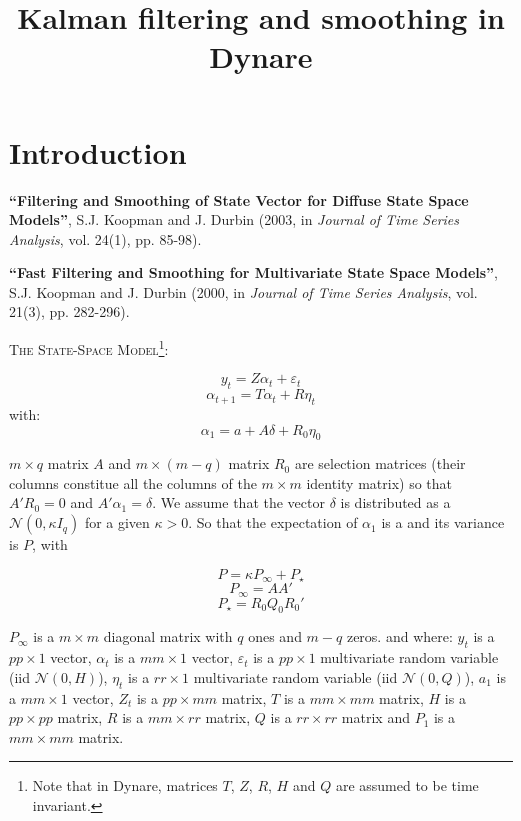 \documentclass{amsart}
\theoremstyle{definition}
\theoremstyle{remark}
\numberwithin{equation}{section}
\begin{document}
\title{Kalman filtering and smoothing in Dynare}%
\maketitle

\section*{Introduction}

\noindent \textbf{``Filtering and Smoothing of State Vector for
Diffuse State Space Models''}, S.J. Koopman and J. Durbin (2003,
in \textit{Journal of Time Series Analysis}, vol. 24(1), pp.
85-98).\newline

\noindent \textbf{``Fast Filtering and Smoothing for Multivariate
State Space Models''}, S.J. Koopman and J. Durbin (2000, in
\textit{Journal of Time Series Analysis}, vol. 21(3), pp.
282-296).\newline


\bigskip

\noindent \textsc{The State-Space Model}\footnote{Note that in
Dynare, matrices $T$, $Z$, $R$, $H$ and $Q$ are assumed to be time
invariant.}:

\[y_t =   Z\alpha_t + \varepsilon_t\]
\[\alpha_{t+1} = T \alpha_t + R\eta_t\]
with:
\[\alpha_1 = a + A\delta + R_0\eta_0\]

\noindent $m\times q$ matrix $A$ and $m\times(m-q)$ matrix $R_0$
are selection matrices (their columns constitue all the columns of
the $m\times m$ identity matrix) so that $A'R_0 = 0$ and
$A'\alpha_1 = \delta$. We assume that the vector $\delta$ is
distributed as a $\mathcal{N}(0,\kappa I_q)$ for a given  $\kappa
> 0$. So that the expectation of $\alpha_1$ is a and its variance
is $P$, with

\[ P = \kappa P_{\infty} + P_{\star}\]
\[           P_{\infty} = A A'\]
\[ P_{\star}  = R_0 Q_0 R_0'\]

\noindent $P_{\infty}$ is a $m\times m$ diagonal matrix with $q$
ones and $m-q$ zeros. and where: $y_t$ is a $pp\times 1$ vector,
$\alpha_t$ is a $mm\times 1$ vector, $\varepsilon_t$ is a
$pp\times 1$ multivariate random variable (iid
$\mathcal{N}(0,H)$), $\eta_t$ is a $rr\times 1$ multivariate
random variable (iid $\mathcal{N}(0,Q)$), $a_1$ is a $mm\times 1$
vector, $Z_t$ is a $pp\times mm$ matrix, $T$ is a $mm \times mm$
matrix, $H$ is a $pp\times pp$ matrix, $R$ is a $mm\times rr$
matrix, $Q$ is a $rr\times rr$ matrix and $P_1$ is a $mm\times mm$
matrix. \newline
\end{document}

